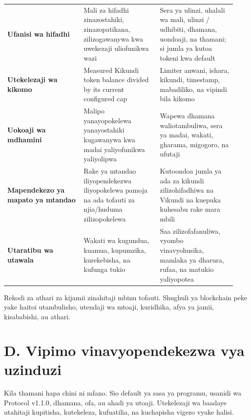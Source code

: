 \documentclass[11pt]{article}
\begin{document}
\begin{longtable}{P{0.31\linewidth} P{0.31\linewidth} P{0.31\linewidth}}
\textbf{Ufanisi wa hifadhi} & Mali za hifadhi zinazostahiki, zinazopatikana, zilizogawanywa kwa uwekezaji uliofunikwa wazi & Sera ya ulinzi, uhalali wa mali, ulinzi / udhibiti, dhamana, uondoaji, na thamani; si jumla ya kutoa tokeni kwa default \\
\textbf{Utekelezaji wa kikomo} & Measured Kikundi token balance divided by its current configured cap & Limiter anwani, ishara, kikundi, timestamp, mabadiliko, na vipindi bila kikomo \\
\textbf{Uokoaji wa mdhamini} & Malipo yanayopokelewa yanayostahiki kugawanywa kwa madai yaliyofunikwa yaliyolipwa & Wapewa dhamana waliotambuliwa, sera ya madai, wakati, gharama, migogoro, na ufutaji \\
\textbf{Mapendekezo ya mapato ya mtandao} & Rake ya mtandao iliyopendekezwa iliyopokelewa pamoja na ada tofauti za njia/huduma zilizopokelewa & Kutoondoa jumla ya ada za kikundi zilizohifadhiwa na Vikundi na kuepuka kuhesabu rake mara mbili \\
\textbf{Utaratibu wa utawala} & Wakati wa kugundua, kuamua, kupumzika, kurekebisha, na kufunga tukio & Saa zilizofafanuliwa, vyombo vinavyohusika, mamlaka ya dharura, rufaa, na matukio yaliyopotea \\
\bottomrule
\end{longtable}

Rekodi za athari za kijamii zinahitaji mbinu tofauti. Shughuli ya blockchain peke yake haitoi utambulisho, utendaji wa mtoaji, kuridhika, afya ya jamii, kisababishi, au athari.


\section*{D. Vipimo vinavyopendekezwa vya uzinduzi}

Kila thamani hapa chini ni mfano. Sio default ya sasa ya programu, usanidi wa Protocol v1.1.0, dhamana, ofa, au ahadi ya utoaji. Utekelezaji wa baadaye utahitaji kupitisha, kutekeleza, kufuatilia, na kuchapisha vigezo vyake halisi.
\end{document}
